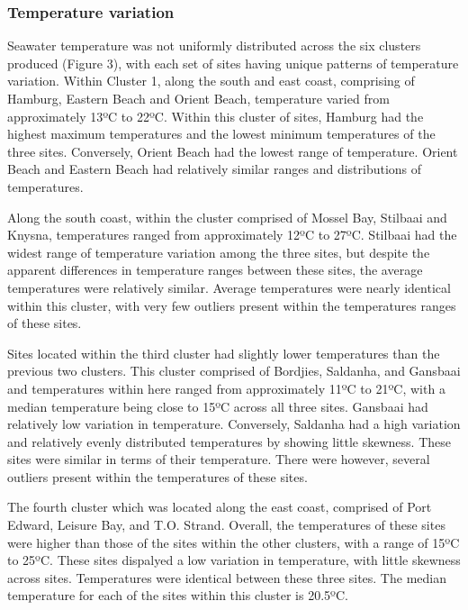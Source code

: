 \documentclass[12pt,a4paper,]{article}
\begin{document}
\hypertarget{temperature-variation}{%
\subsubsection{Temperature variation}\label{temperature-variation}}

Seawater temperature was not uniformly distributed across the six
clusters produced (Figure 3), with each set of sites having unique
patterns of temperature variation. Within Cluster 1, along the south and
east coast, comprising of Hamburg, Eastern Beach and Orient Beach,
temperature varied from approximately 13ºC to 22ºC. Within this cluster
of sites, Hamburg had the highest maximum temperatures and the lowest
minimum temperatures of the three sites. Conversely, Orient Beach had
the lowest range of temperature. Orient Beach and Eastern Beach had
relatively similar ranges and distributions of temperatures.

Along the south coast, within the cluster comprised of Mossel Bay,
Stilbaai and Knysna, temperatures ranged from approximately 12ºC to
27ºC. Stilbaai had the widest range of temperature variation among the
three sites, but despite the apparent differences in temperature ranges
between these sites, the average temperatures were relatively similar.
Average temperatures were nearly identical within this cluster, with
very few outliers present within the temperatures ranges of these sites.

Sites located within the third cluster had slightly lower temperatures
than the previous two clusters. This cluster comprised of Bordjies,
Saldanha, and Gansbaai and temperatures within here ranged from
approximately 11ºC to 21ºC, with a median temperature being close to
15ºC across all three sites. Gansbaai had relatively low variation in
temperature. Conversely, Saldanha had a high variation and relatively
evenly distributed temperatures by showing little skewness. These sites
were similar in terms of their temperature. There were however, several
outliers present within the temperatures of these sites.

The fourth cluster which was located along the east coast, comprised of
Port Edward, Leisure Bay, and T.O. Strand. Overall, the temperatures of
these sites were higher than those of the sites within the other
clusters, with a range of 15ºC to 25ºC. These sites dispalyed a low
variation in temperature, with little skewness across sites.
Temperatures were identical between these three sites. The median
temperature for each of the sites within this cluster is 20.5ºC.
\end{document}
